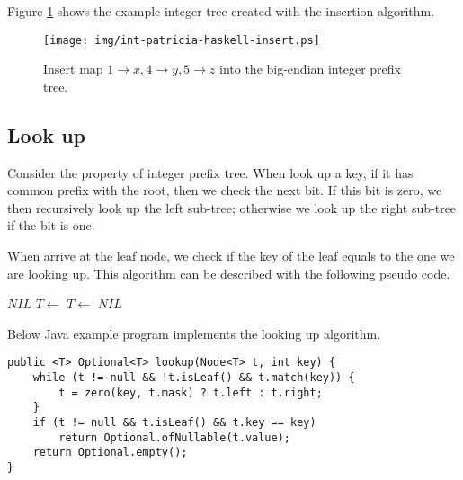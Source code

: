 \documentclass{article}
\begin{document}
Figure \ref{fig:int-patricia-haskell-insert} shows the example integer tree created
with the insertion algorithm.

\begin{figure}[htbp]
  \centering
  \texttt{[image: img/int-patricia-haskell-insert.ps]}
  \caption{Insert map $1 \rightarrow x, 4 \rightarrow y, 5 \rightarrow z$ into the big-endian integer prefix tree.}
  \label{fig:int-patricia-haskell-insert}
\end{figure}


\subsection{Look up}
Consider the property of integer prefix tree. When look up a
key, if it has common prefix with the root,
then we check the next bit. If
this bit is zero, we then recursively look up the left sub-tree;
otherwise we look up the right sub-tree if the bit is one.

When arrive at the leaf node, we check if the key of the
leaf equals to the one we are looking up. This algorithm can be
described with the following pseudo code.

\begin{algorithmic}[1]
    \State \Return $NIL$ 
  \EndIf
      \State $T \gets$ 
    \Else
      \State $T \gets$ 
    \EndIf
  \EndWhile
    \State \Return {}
  \Else
    \State \Return $NIL$ 
  \EndIf
\EndFunction
\end{algorithmic}

Below Java example program implements the looking up algorithm.

\lstset{language=Java}
\begin{lstlisting}
public <T> Optional<T> lookup(Node<T> t, int key) {
    while (t != null && !t.isLeaf() && t.match(key)) {
        t = zero(key, t.mask) ? t.left : t.right;
    }
    if (t != null && t.isLeaf() && t.key == key)
        return Optional.ofNullable(t.value);
    return Optional.empty();
}
\end{lstlisting}
\end{document}
